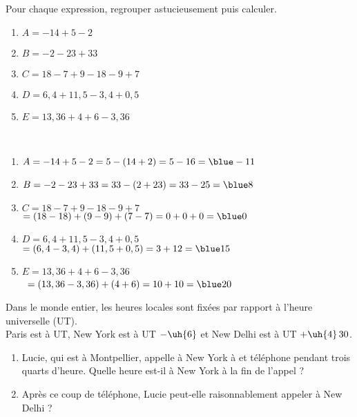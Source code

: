 \begin{colonne*exercice}
\bigskip


\begin{exercice} %
   Pour chaque expression, regrouper astucieusement puis calculer.
   \begin{enumerate}
      \item $A =-14+5-2$
      \item $B =-2-23+33$
      \item $C =18-7+9-18-9+7$
      \item $D =6,4+11,5-3,4+0,5$
      \item $E =13,36+4+6-3,36$
   \end{enumerate}
\end{exercice}

\begin{corrige}
   \ \\[-5mm]
   \begin{enumerate}
      \item $A =-14+5-2 =5-(14+2) =5-16 =\blue -11$
      \item $B =-2-23+33 =33-(2+23) =33-25 =\blue 8$
      \item $C =18-7+9-18-9+7$ \\
          \qquad\; $=(18-18)+(9-9)+(7-7) =0+0+0 =\blue 0$
      \item $D =6,4+11,5-3,4+0,5$ \\
         \qquad\; $=(6,4-3,4)+(11,5+0,5) =3+12 =\blue 15$
   \end{enumerate}
   
\Coupe

   \begin{enumerate}
   \setcounter{enumi}{4}
      \item $E =13,36+4+6-3,36$ \\
         \qquad\, $=(13,36-3,36)+(4+6) =10+10 =\blue 20$
   \end{enumerate}
\end{corrige}

\bigskip


\begin{exercice} %
   Dans le monde entier, les heures locales sont fixées par rapport à l'heure universelle (UT). \\
   Paris est à UT, New York est à UT $-\uh{6}$ et New Delhi est à UT $+\uh{4}\,30$.
   \begin{enumerate}
      \item Lucie, qui est à Montpellier, appelle à New York à  et téléphone pendant trois quarts d'heure. Quelle heure est-il à New York à la fin de l'appel ?
      \item Après ce coup de téléphone, Lucie peut-elle raisonnablement appeler à New Delhi ?
   \end{enumerate}
\end{exercice}


\end{colonne*exercice}
